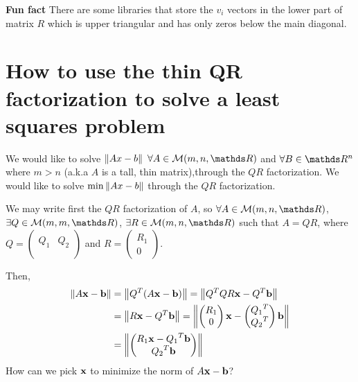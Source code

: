 \documentclass[computationalMathematics.tex]{subfiles}
\begin{document}
\begin{myframe}{\bf Fun fact}
There are some libraries that store the $v_{i}$ vectors in the lower part of matrix $R$ which is upper triangular and has only zeros below the main diagonal.
\end{myframe}

\section{How to use the thin QR factorization to solve a least squares problem}

We would like to solve $\left\lVert Ax-b\right\rVert$ $\forall A \in \mathcal{M}(m, n, \R)$ and $\forall B \in \R^n$ where $m > n$ (a.k.a $A$ is a tall, thin matrix),through the $QR$ factorization.
We would like to solve $\min \left\lVert Ax-b\right\rVert$ through the $QR$ factorization.

We may write first the $QR$ factorization of $A$, so $\forall A \in \mathcal{M}(m, n, \R)$, $\exists Q \in \mathcal{M}(m, m, \R)$, $\exists R \in \mathcal{M}(m, n, \R)$ such that $A = QR$, where 
$Q = \begin{pmatrix}
  &\\
  Q_1 & Q_2\\
  &\\
\end{pmatrix}$ and $R = \begin{pmatrix}
    R_1\\0
\end{pmatrix}$.

Then, 
\begin{equation}
\begin{aligned}
  \left\lVert A\mathbf{x}-\mathbf{b}\right\rVert &= \left\lVert{Q}^{T}(A\mathbf{x}-\mathbf{b})\right\rVert = \left\lVert{Q}^{T}QR\mathbf{x} - {Q}^{T}\mathbf{b}\right\rVert \\
  & = \left\lVert R\mathbf{x}-{Q}^{T}\mathbf{b}\right\rVert = \left\lVert\begin{pmatrix}
    R_1\\0
\end{pmatrix}\mathbf{x} - \begin{pmatrix}
  {Q_{1}}^{T}\\
    {Q_{2}}^{T}
\end{pmatrix}\mathbf{b}\right\rVert\\
&=\left\lVert\begin{pmatrix}
  R_{1} \mathbf{x} - {Q_{1}}^{T} \mathbf{b}\\
    {Q_{2}}^{T}\mathbf{b}
\end{pmatrix}\right\rVert
\end{aligned}
\end{equation}
How can we pick $\mathbf{x}$ to minimize the norm of $A\mathbf{x} - \mathbf{b}$?
\end{document}

